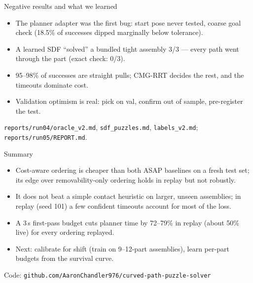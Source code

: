 \documentclass[aspectratio=169,11pt]{beamer}
\newcommand{\src}[1]{\vfill{\tiny\color{gr}#1}}
\begin{document}
\begin{frame}{Negative results and what we learned}
\begin{itemize}
\item The planner adapter was the first bug: start pose never tested, coarse goal check (18.5\% of successes dipped marginally below tolerance).
\item A learned SDF ``solved'' a bundled tight assembly 3/3 --- every path went through the part (exact check: 0/3).
\item 95--98\% of successes are straight pulls; CMG-RRT decides the rest, and the timeouts dominate cost.
\item Validation optimism is real: pick on val, confirm out of sample, pre-register the test.
\end{itemize}
\src{\texttt{reports/run04/oracle\_v2.md}, \texttt{sdf\_puzzles.md}, \texttt{labels\_v2.md}; \texttt{reports/run05/REPORT.md}.}
\end{frame}

\begin{frame}{Summary}
\begin{itemize}
\item Cost-aware ordering is cheaper than both ASAP baselines on a fresh test set; its edge over removability-only ordering holds in replay but not robustly.
\item It does not beat a simple contact heuristic on larger, unseen assemblies; in replay (seed 101) a few confident timeouts account for most of the loss.
\item A 3\,s first-pass budget cuts planner time by 72--79\% in replay (about 50\% live) for every ordering replayed.
\item Next: calibrate for shift (train on 9--12-part assemblies), learn per-part budgets from the survival curve.
\end{itemize}
\vfill
{\small Code: \texttt{github.com/AaronChandler976/curved-path-puzzle-solver}}
\end{frame}
\end{document}
